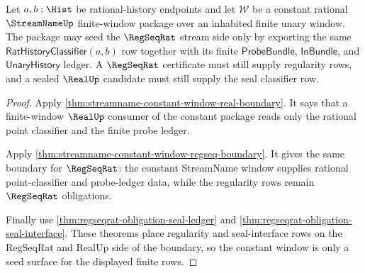 \begin{theorem}
\label{thm:streamname-real-regseq-constant-boundary}
Let $a,b:\Hist$ be rational-history endpoints and let $\mathcal{W}$ be a
constant rational $\StreamNameUp$ finite-window package over an inhabited
finite unary window. The package may seed the $\RegSeqRat$ stream side only by
exporting the same $\mathsf{RatHistoryClassifier}(a,b)$ row together with its
finite $\mathsf{ProbeBundle}$, $\mathsf{InBundle}$, and $\mathsf{UnaryHistory}$
ledger. A $\RegSeqRat$ certificate must still supply regularity rows, and a
sealed $\RealUp$ candidate must still supply the seal classifier row.
\end{theorem}
\begin{proof}
Apply \autoref{thm:streamname-constant-window-real-boundary}. It says that a
finite-window $\RealUp$ consumer of the constant package reads only the rational
point classifier and the finite probe ledger.

Apply \autoref{thm:streamname-constant-window-regseq-boundary}. It gives the
same boundary for $\RegSeqRat$: the constant StreamName window supplies rational
point-classifier and probe-ledger data, while the regularity rows remain
$\RegSeqRat$ obligations.

Finally use \autoref{thm:regseqrat-obligation-seal-ledger} and
\autoref{thm:regseqrat-obligation-seal-interface}. These theorems place
regularity and seal-interface rows on the RegSeqRat and RealUp side of the
boundary, so the constant window is only a seed surface for the displayed finite
rows.
\end{proof}


